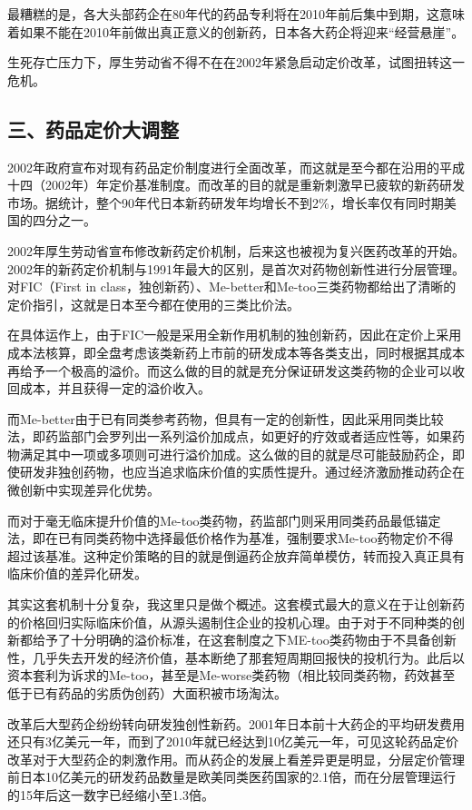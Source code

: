最糟糕的是，各大头部药企在80年代的药品专利将在2010年前后集中到期，这意味着如果不能在2010年前做出真正意义的创新药，日本各大药企将迎来“经营悬崖”。

生死存亡压力下，厚生劳动省不得不在在2002年紧急启动定价改革，试图扭转这一危机。

\subsection{三、药品定价大调整}

2002年政府宣布对现有药品定价制度进行全面改革，而这就是至今都在沿用的平成十四（2002年）年定价基准制度。而改革的目的就是重新刺激早已疲软的新药研发市场。据统计，整个90年代日本新药研发年均增长不到2\%，增长率仅有同时期美国的四分之一。

2002年厚生劳动省宣布修改新药定价机制，后来这也被视为复兴医药改革的开始。2002年的新药定价机制与1991年最大的区别，是首次对药物创新性进行分层管理。对FIC（First in class，独创新药）、Me-better和Me-too三类药物都给出了清晰的定价指引，这就是日本至今都在使用的三类比价法。

在具体运作上，由于FIC一般是采用全新作用机制的独创新药，因此在定价上采用成本法核算，即全盘考虑该类新药上市前的研发成本等各类支出，同时根据其成本再给予一个极高的溢价。而这么做的目的就是充分保证研发这类药物的企业可以收回成本，并且获得一定的溢价收入。

而Me-better由于已有同类参考药物，但具有一定的创新性，因此采用同类比较法，即药监部门会罗列出一系列溢价加成点，如更好的疗效或者适应性等，如果药物满足其中一项或多项则可进行溢价加成。这么做的目的就是尽可能鼓励药企，即使研发非独创药物，也应当追求临床价值的实质性提升。通过经济激励推动药企在微创新中实现差异化优势。

而对于毫无临床提升价值的Me-too类药物，药监部门则采用同类药品最低锚定法，即在已有同类药物中选择最低价格作为基准，强制要求Me-too药物定价不得超过该基准。这种定价策略的目的就是倒逼药企放弃简单模仿，转而投入真正具有临床价值的差异化研发。

其实这套机制十分复杂，我这里只是做个概述。这套模式最大的意义在于让创新药的价格回归实际临床价值，从源头遏制住企业的投机心理。由于对于不同种类的创新都给予了十分明确的溢价标准，在这套制度之下ME-too类药物由于不具备创新性，几乎失去开发的经济价值，基本断绝了那套短周期回报快的投机行为。此后以资本套利为诉求的Me-too，甚至是Me-worse类药物（相比较同类药物，药效甚至低于已有药品的劣质伪创药）大面积被市场淘汰。

改革后大型药企纷纷转向研发独创性新药。2001年日本前十大药企的平均研发费用还只有3亿美元一年，而到了2010年就已经达到10亿美元一年，可见这轮药品定价改革对于大型药企的刺激作用。而从药企的发展上看差异更是明显，分层定价管理前日本10亿美元的研发药品数量是欧美同类医药国家的2.1倍，而在分层管理运行的15年后这一数字已经缩小至1.3倍。


